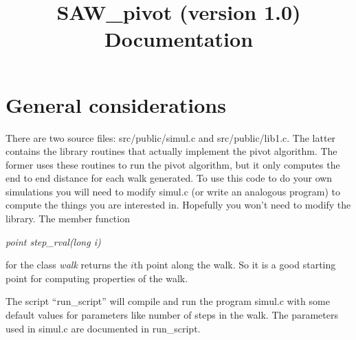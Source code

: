 
      
\epsfverbosetrue

\newcommand{\be}{\begin{equation}}
\newcommand{\ee}{\end{equation}}
\newcommand{\bea}{\begin{eqnarray}}
\newcommand{\eea}{\end{eqnarray}}
\newcommand \no {\noindent}
\newcommand \qed{\vrule height5pt width5pt}
\newcommand \type {\it}
\newcommand \reals {R}

\def\reff#1{(\ref{#1})}

\newtheorem{definition}{Definition}
\newtheorem{proposition}{Proposition}
\newtheorem{lemma}{Lemma}
\newtheorem{theorem}{Theorem}

\setlength{\textheight}{21cm}
\setlength{\textwidth}{16cm}
\oddsidemargin 0.0in
\evensidemargin 0.0in
\topmargin 0.0in
\pagestyle{plain}




\title{SAW\_pivot  (version 1.0) Documentation}

\maketitle

\section{General considerations} 

There are two source files: src/public/simul.c and src/public/lib1.c.
The latter contains the library routines that actually implement the 
pivot algorithm. The former uses these routines to run the pivot algorithm,
but it only computes the end to end distance for each walk generated.
To use this code to do your own simulations you will need to modify 
simul.c (or write an analogous program) to compute the things you are 
interested in. Hopefully you won't need to modify the library.
The member function 

{\type point step\_rval(long i)}

\noindent for the class {\type walk} returns the $i$th point along the walk. 
So it is a good starting point for computing properties of the walk.

The script ``run\_script'' will compile and run the program simul.c
with some default values for parameters like number of steps in the 
walk. The parameters used in simul.c are documented in run\_script.

